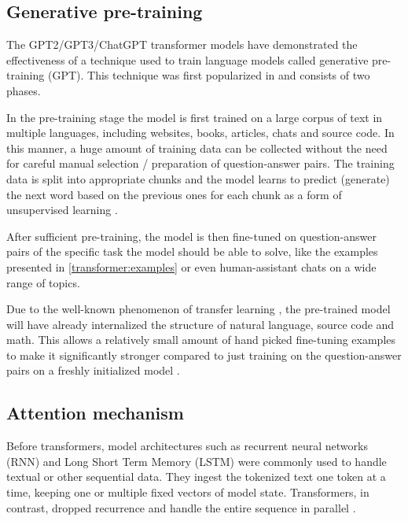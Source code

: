 \subsection{Generative pre-training}

The GPT2/GPT3/ChatGPT transformer models have demonstrated the effectiveness of a technique used to train language models called generative pre-training (GPT). This technique was first popularized in \cite{improvinglu} and consists of two phases.

In the pre-training stage the model is first trained on a large corpus of text in multiple languages, including websites, books, articles, chats and source code. In this manner, a huge amount of training data can be collected without the need for careful manual selection / preparation of question-answer pairs. The training data is split into appropriate chunks and the model learns to predict (generate) the next word based on the previous ones for each chunk as a form of unsupervised learning .

After sufficient pre-training, the model is then fine-tuned on question-answer pairs of the specific task the model should be able to solve, like the examples presented in \cref{transformer:examples} or even human-assistant chats on a wide range of topics.

Due to the well-known phenomenon of transfer learning \cite{transferlearning}, the pre-trained model will have already internalized the structure of natural language, source code and math. 
This allows a relatively small amount of hand picked fine-tuning examples to make it significantly stronger compared to just training on the question-answer pairs on a freshly initialized model .

\subsection{Attention mechanism}
\label{transformer:attn}

Before transformers, model architectures such as recurrent neural networks (RNN) and Long Short Term Memory (LSTM) were commonly used to handle textual or other sequential data. They ingest the tokenized text one token at a time, keeping one or multiple fixed vectors of model state. Transformers, in contrast, dropped recurrence and handle the entire sequence in parallel .

